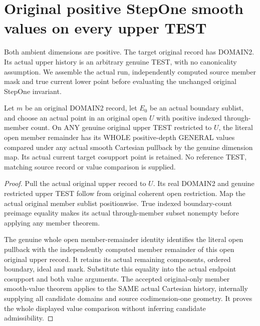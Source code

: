 \section{Original positive StepOne smooth values on every upper TEST}

Both ambient dimensions are positive. The target original record has
DOMAIN2. Its actual upper history is an arbitrary genuine TEST, with
no canonicality assumption. We assemble the actual run, independently
computed source member mask and true current lower point before
evaluating the unchanged original StepOne invariant.

\begin{theorem}
\label{hir:original-open-member-untested-whole-smooth-values}
\leanok
Let $m$ be an original DOMAIN2 record, let $E_0$ be an actual boundary
sublist, and choose an actual point in an original open $U$ with
positive indexed through-member count. On ANY genuine original upper
TEST restricted to $U$, the literal open member remainder has its
WHOLE positive-depth GENERAL values compared under any actual smooth
Cartesian pullback by the genuine dimension map. Its actual current
target cosupport point is retained. No reference TEST, matching source
record or value comparison is supplied.
\end{theorem}
\begin{proof}
Pull the actual original upper record to $U$. Its real DOMAIN2 and
genuine restricted upper TEST follow from original coherent open
restriction. Map the actual original member sublist positionwise.
True indexed boundary-count preimage equality makes its actual
through-member subset nonempty before applying any member theorem.

The genuine whole open member-remainder identity identifies the literal
open pullback with the independently computed member remainder of this
open original upper record. It retains its actual remaining components,
ordered boundary, ideal and mark. Substitute this equality into the
actual endpoint cosupport and both value arguments. The accepted
original-only member smooth-value theorem applies to the SAME actual
Cartesian history, internally supplying all candidate domains and
source codimension-one geometry. It proves the whole displayed value
comparison without inferring candidate admissibility.
\end{proof}


